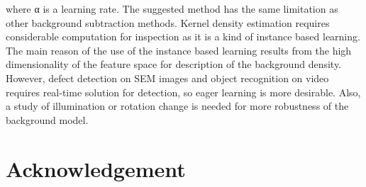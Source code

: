 \documentclass[conference]{IEEEtran}
\begin{document}
where α is a learning rate. 
The suggested method has the same limitation as other background subtraction methods. Kernel density estimation requires considerable computation for inspection as it is a kind of instance based learning. The main reason of the use of the instance based learning results from the high dimensionality of the feature space for description of the background density. However, defect detection on SEM images and object recognition on video requires real-time solution for detection, so eager learning is more desirable. Also, a study of illumination or rotation change is needed for more robustness of the background model.

\section*{Acknowledgement}






% 



%
%
\end{document}
